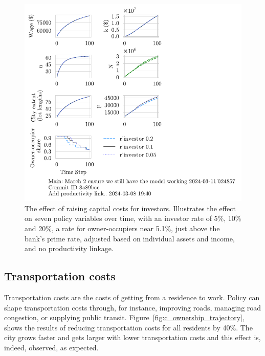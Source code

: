 \begin{figure}[h!t]
    \centering
    \includegraphics[scale=1., trim={0 1.4cm 0 0},clip]{fig/r_investor-Main-024857.pdf}
    \caption[The effect of raising capital costs for investors]{The effect of raising capital costs for investors. Illustrates the effect on seven policy variables over time, with an investor rate of 5\%, 10\% and 20\%, a rate for owner-occupiers near 5.1\%, just above the bank's prime rate, adjusted based on individual assets and income, and no productivity linkage.}
    \label{fig:capital_ownership_trajectory}
\end{figure}

\newpage

\subsection{Transportation costs} 
Transportation costs are the costs of getting from a residence to work. Policy can shape transportation costs through, for instance, improving roads, managing road congestion, or supplying public transit. %
Figure~\ref{fig:c_ownership_trajectory}, shows the results of reducing transportation costs for all residents by 40\%. 
The city grows faster and gets larger with lower transportation costs and this effect is, indeed, observed, as expected. %

